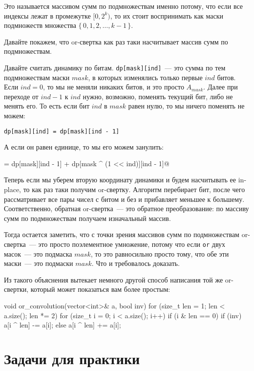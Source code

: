 Это называется массивом сумм по подмножествам именно потому, что если все индексы лежат в промежутке $[0, 2^k)$, то их стоит воспринимать как маски подмножеств множества $\{\, 0, 1, 2, \ldots, k - 1 \,\}$.

Давайте покажем, что or-свертка как раз таки насчитывает массив сумм по подмножествам.

Давайте считать динамику по битам. \verb+dp[mask][ind]+~--- это сумма по тем подмножествам маски $mask$, в которых изменялись только первые $ind$ битов. Если $ind = 0$, то мы не меняли никаких битов, и это просто $A_{mask}$. Далее при переходе от $ind - 1$ к $ind$ нужно, возможно, поменять текущий бит, либо не менять его. То есть если бит $ind$ в $mask$ равен нулю, то мы ничего поменять не можем:

\verb^dp[mask][ind] = dp[mask][ind - 1]^

А если он равен единице, то мы его можем занулить:

\verb@dp[mask][ind] = dp[mask][ind - 1] + dp[mask ^ (1 << ind)][ind - 1]@

Теперь если мы уберем вторую координату динамики и будем насчитывать ее in-place, то как раз таки получим or-свертку. Алгоритм перебирает бит, после чего рассматривает все пары чисел с битом и без и прибавляет меньшее к большему. Соответственно, обратная or-свертка~--- это обратное преобразование: по массиву сумм по подмножествам получаем изначальный массив.

Тогда остается заметить, что с точки зрения массивов сумм по подмножествам or-свертка~--- это просто поэлементное умножение, потому что если \verb+or+ двух масок~--- это подмаска $mask$, то это равносильно просто тому, что обе эти маски~--- это подмаски $mask$.
Что и требовалось доказать.

Из такого объяснения вытекает немного другой способ написания той же or-свертки, который может показаться вам более простым:

\begin{code}
void or_convolution(vector<int>& a, bool inv) {
    for (size_t len = 1; len < a.size(); len *= 2) {
        for (size_t i = 0; i < a.size(); i++) {
            if (i & len == 0) {
                if (inv) {
                    a[i ^ len] -= a[i];
                } else {
                    a[i ^ len] += a[i];
                }
            }
        }
    }
}
\end{code}


\section{Задачи для практики}

